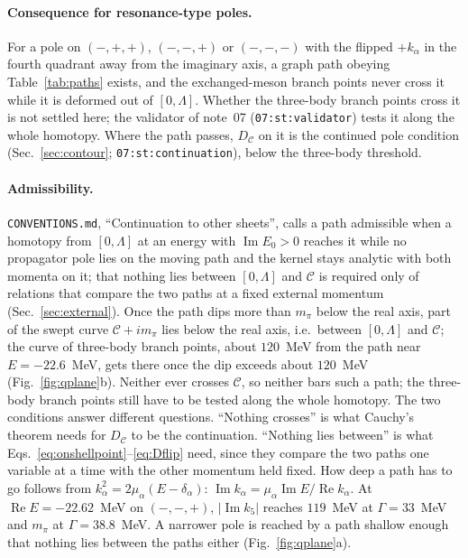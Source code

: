 \documentclass[11pt]{article}
\newcommand{\file}[1]{\nolinkurl{#1}}
\begin{document}
\paragraph{Consequence for resonance-type poles.}
For a pole on $(-,+,+)$, $(-,-,+)$ or $(-,-,-)$ with the flipped $+k_\alpha$ in the fourth quadrant away from the imaginary axis, a graph path obeying Table~\ref{tab:paths} exists, and the exchanged-meson branch points never cross it while it is deformed out of $[0,\Lambda]$. Whether the three-body branch points cross it is not settled here; the validator of note~07 (\texttt{07:st:validator}) tests it along the whole homotopy. Where the path passes, $D_{\mathcal C}$ on it is the continued pole condition (Sec.~\ref{sec:contour}; \texttt{07:st:continuation}), below the three-body threshold.

\paragraph{Admissibility.} \file{CONVENTIONS.md}, ``Continuation to other sheets'', calls a path admissible when a homotopy from $[0,\Lambda]$ at an energy with $\operatorname{Im}E_0>0$ reaches it while no propagator pole lies on the moving path and the kernel stays analytic with both momenta on it; that nothing lies between $[0,\Lambda]$ and $\mathcal C$ is required only of relations that compare the two paths at a fixed external momentum (Sec.~\ref{sec:external}). Once the path dips more than $m_\pi$ below the real axis, part of the swept curve $\mathcal C+im_\pi$ lies below the real axis, i.e.\ between $[0,\Lambda]$ and $\mathcal C$; the curve of three-body branch points, about $120$~MeV from the path near $E=-22.6$~MeV, gets there once the dip exceeds about $120$~MeV (Fig.~\ref{fig:qplane}b). Neither ever crosses $\mathcal C$, so neither bars such a path; the three-body branch points still have to be tested along the whole homotopy. The two conditions answer different questions. ``Nothing crosses'' is what Cauchy's theorem needs for $D_{\mathcal C}$ to be the continuation. ``Nothing lies between'' is what Eqs.~\eqref{eq:onshellpoint}--\eqref{eq:Dflip} need, since they compare the two paths one variable at a time with the other momentum held fixed. How deep a path has to go follows from $k_\alpha^2=2\mu_\alpha(E-\delta_\alpha)$: $\operatorname{Im}k_\alpha=\mu_\alpha\operatorname{Im}E/\operatorname{Re}k_\alpha$. At $\operatorname{Re}E=-22.62$~MeV on $(-,-,+)$, $|\operatorname{Im}k_5|$ reaches $119$~MeV at $\Gamma=33$~MeV and $m_\pi$ at $\Gamma=38.8$~MeV. A narrower pole is reached by a path shallow enough that nothing lies between the paths either (Fig.~\ref{fig:qplane}a).
\end{document}
